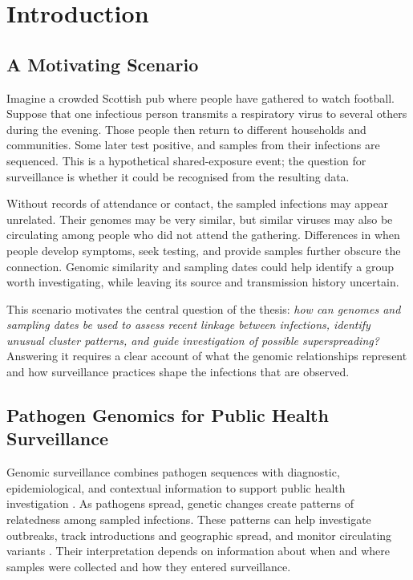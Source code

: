 \chapter{Introduction}\label{ch:introduction}

\section{A Motivating Scenario}\label{sec:ch1_motivating_scenario}

Imagine a crowded Scottish pub where people have gathered to watch football. Suppose that one infectious person transmits a respiratory virus to several others during the evening. Those people then return to different households and communities. Some later test positive, and samples from their infections are sequenced. This is a hypothetical shared-exposure event; the question for surveillance is whether it could be recognised from the resulting data.

Without records of attendance or contact, the sampled infections may appear unrelated. Their genomes may be very similar, but similar viruses may also be circulating among people who did not attend the gathering. Differences in when people develop symptoms, seek testing, and provide samples further obscure the connection. Genomic similarity and sampling dates could help identify a group worth investigating, while leaving its source and transmission history uncertain.

This scenario motivates the central question of the thesis: \emph{how can genomes and sampling dates be used to assess recent linkage between infections, identify unusual cluster patterns, and guide investigation of possible superspreading?} Answering it requires a clear account of what the genomic relationships represent and how surveillance practices shape the infections that are observed.

\section{Pathogen Genomics for Public Health Surveillance}\label{sec:ch1_genomic_surveillance}

Genomic surveillance combines pathogen sequences with diagnostic, epidemiological, and contextual information to support public health investigation \citep{WHO2023,Armstrong2019,Black2020}. As pathogens spread, genetic changes create patterns of relatedness among sampled infections. These patterns can help investigate outbreaks, track introductions and geographic spread, and monitor circulating variants \citep{Gardy2017,Struelens2024}. Their interpretation depends on information about when and where samples were collected and how they entered surveillance.

